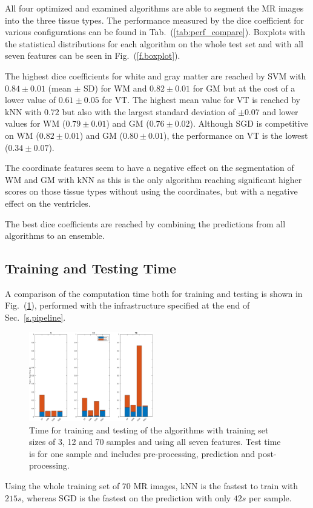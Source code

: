 \documentclass[journal]{IEEEtran}
\begin{document}
All four optimized and examined algorithms are able to segment the MR images into the three tissue types. The performance measured by the dice coefficient for various configurations can be found in Tab.~(\ref{tab:perf_compare}). Boxplots with the statistical distributions for each algorithm on the whole test set and with all seven features can be seen in Fig.~(\ref{f.boxplot}).

The highest dice coefficients for white and gray matter are reached by SVM with $0.84 \pm 0.01$ (mean $\pm$ SD) for WM and $0.82 \pm 0.01$ for GM but at the cost of a lower value of $0.61 \pm 0.05$ for VT. The highest mean value for VT is reached by kNN with $0.72$ but also with the largest standard deviation of $\pm 0.07$ and lower values for WM ($0.79 \pm 0.01$) and GM ($0.76 \pm 0.02$). Although SGD is competitive on WM ($0.82 \pm 0.01$) and GM ($0.80 \pm 0.01$), the performance on VT is the lowest ($0.34 \pm 0.07$).

The coordinate features seem to have a negative effect on the segmentation of WM and GM with kNN as this is the only algorithm reaching significant higher scores on those tissue types without using the coordinates, but with a negative effect on the ventricles.

The best dice coefficients are reached by combining the predictions from all algorithms to an ensemble.

\subsection{Training and Testing Time}
A comparison of the computation time both for training and testing is shown in Fig.~(\ref{f.runtimebarplot}), performed with the infrastructure specified at the end of Sec.~\ref{s.pipeline}.
\begin{figure}
	\centering
	\includegraphics[width=0.48\textwidth]{images/runtimes}
	\caption{Time for training and testing of the algorithms with training set sizes of 3, 12 and 70 samples and using all seven features. Test time is for one sample and includes pre-processing, prediction and post-processing.}\label{f.runtimebarplot}
\end{figure}
Using the whole training set of 70 MR images, kNN is the fastest to train with $215s$, whereas SGD is the fastest on the prediction with only $42s$ per sample.
\end{document}
